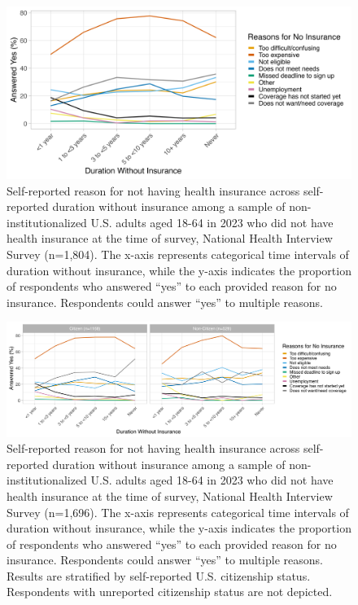 \documentclass[12pt]{article}
\begin{document}
\begin{figure}[H]
  \centering
  \includegraphics[width=15cm]{figures/duration_no_insurance_by_reason.png}
  \caption{Self-reported reason for not having health insurance across self-reported duration without insurance among a sample of non-institutionalized U.S. adults aged 18-64 in 2023 who did not have health insurance at the time of survey, National Health Interview Survey (n=1,804). The x-axis represents categorical time intervals of duration without insurance, while the y-axis indicates the proportion of respondents who answered “yes” to each provided reason for no insurance. Respondents could answer “yes” to multiple reasons.}
\end{figure}

\begin{figure}[H]
  \centering
  \includegraphics[width=15cm]{figures/duration_no_insurance_by_reason_by_citizen.png}
  \caption{Self-reported reason for not having health insurance across self-reported duration without insurance among a sample of non-institutionalized U.S. adults aged 18-64 in 2023 who did not have health insurance at the time of survey, National Health Interview Survey (n=1,696). The x-axis represents categorical time intervals of duration without insurance, while the y-axis indicates the proportion of respondents who answered “yes” to each provided reason for no insurance. Respondents could answer “yes” to multiple reasons. Results are stratified by self-reported U.S. citizenship status. Respondents with unreported citizenship status are not depicted.}
\end{figure}
\end{document}
